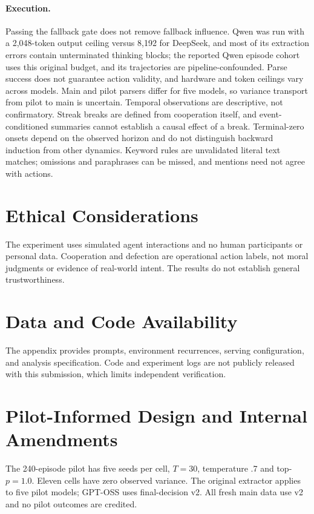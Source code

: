 \documentclass[11pt]{article}
\begin{document}
\paragraph{Execution.} Passing the fallback gate does not remove fallback influence. Qwen was run with a 2{,}048-token output ceiling versus 8{,}192 for DeepSeek, and most of its extraction errors contain unterminated thinking blocks; the reported Qwen episode cohort uses this original budget, and its trajectories are pipeline-confounded. Parse success does not guarantee action validity, and hardware and token ceilings vary across models. Main and pilot parsers differ for five models, so variance transport from pilot to main is uncertain. Temporal observations are descriptive, not confirmatory. Streak breaks are defined from cooperation itself, and event-conditioned summaries cannot establish a causal effect of a break. Terminal-zero onsets depend on the observed horizon and do not distinguish backward induction from other dynamics. Keyword rules are unvalidated literal text matches; omissions and paraphrases can be missed, and mentions need not agree with actions.

\section*{Ethical Considerations}
The experiment uses simulated agent interactions and no human participants or personal data. Cooperation and defection are operational action labels, not moral judgments or evidence of real-world intent. The results do not establish general trustworthiness.

\section*{Data and Code Availability}
The appendix provides prompts, environment recurrences, serving configuration, and analysis specification. Code and experiment logs are not publicly released with this submission, which limits independent verification.


\appendix

\section{Pilot-Informed Design and Internal Amendments}
\label{sec:appendix-amendment}
The 240-episode pilot has five seeds per cell, $T=30$, temperature .7 and top-$p=1.0$. Eleven cells have zero observed variance. The original extractor applies to five pilot models; GPT-OSS uses final-decision v2. All fresh main data use v2 and no pilot outcomes are credited.
\end{document}
